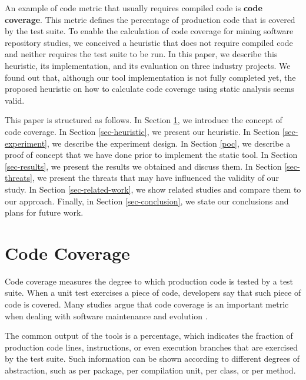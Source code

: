 \documentclass{sig-alternate}
\begin{document}
An example of code metric that usually requires compiled code is \textbf{code coverage}. 
This metric defines the percentage of production code that is covered 
by the test suite. To enable the calculation of code coverage for mining software
repository studies, we conceived a heuristic that does not require compiled code
and neither requires the test suite to be run. In this paper, we describe this heuristic,
its implementation, and its evaluation on three industry projects. 
We found out that, although our tool implementation is not fully completed yet, the 
proposed heuristic on how to calculate code coverage using static analysis seems valid. 

This paper is structured as follows. In Section \ref{sec-code-coverage}, 
we introduce the concept of code coverage. In Section \ref{sec-heuristic}, 
we present our heuristic. In Section \ref{sec-experiment}, we describe the 
experiment design. In Section \ref{poc}, we describe a proof of concept that
we have done prior to implement the static tool. 
In Section \ref{sec-results}, we present the results we 
obtained and discuss them. In Section \ref{sec-threats}, 
we present the threats that may have influenced the validity of our study. 
In Section \ref{sec-related-work}, we show related studies and compare them 
to our approach. Finally, in Section \ref{sec-conclusion}, we state our 
conclusions and plans for future work.


\section{Code Coverage}
\label{sec-code-coverage}

Code coverage measures the degree to which production code is tested by a test suite. 
When a unit test exercises a piece of code, developers say that such piece
of code is covered. Many studies argue that code coverage is an important
metric when dealing with software maintenance and evolution \cite{sebastian} \cite{del-frate} \cite{mei-hwa}.

The common output of the tools is a percentage, which indicates the fraction of production code lines, instructions, 
or even execution branches that are exercised by the test suite. Such information can be shown according to different
degrees of abstraction, such as per package, per compilation unit, per class, or per method. 
\end{document}
